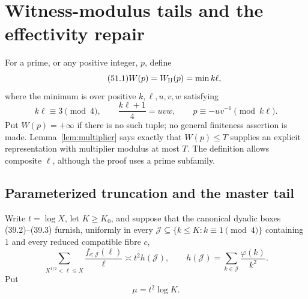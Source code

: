 \documentclass[10pt,reqno]{amsart}
\theoremstyle{definition}
\newcommand{\1}{\mathbf 1}
\begin{document}
\begingroup
\setlength{\abovedisplayskip}{6pt plus 2pt minus 2pt}
\setlength{\belowdisplayskip}{6pt plus 2pt minus 2pt}
\setlength{\abovedisplayshortskip}{2pt plus 1pt}
\setlength{\belowdisplayshortskip}{4pt plus 1pt minus 1pt}
\linespread{0.97}\selectfont
\section{Witness-modulus tails and the effectivity repair}
\label{sec:witness-tail}
For a prime, or any positive integer, $p$, define
\begin{equation}\tag{51.1}
 W(p)=W_{\rm II}(p)=\min k\ell,
\end{equation}
where the minimum is over positive $k,\ell,u,v,w$ satisfying
\begin{equation}\tag{51.2}
 k\ell\equiv3\pmod4,\qquad \frac{k\ell+1}{4}=uvw,
 \qquad p\equiv-uv^{-1}\pmod {k\ell}.
\end{equation}
Put $W(p)=+\infty$ if there is no such tuple; no general finiteness
assertion is made.  Lemma~\ref{lem:multiplier} says exactly that $W(p)\leq T$
supplies an explicit representation with multiplier modulus at most $T$.
The definition allows composite $\ell$, although the proof uses a prime
subfamily.

\subsection{Parameterized truncation and the master tail}
Write $t=\log X$, let $K\geq K_0$, and suppose that the canonical dyadic
boxes (39.2)--(39.3) furnish, uniformly in every
$\mathcal J\subseteq\{k\leq K:k\equiv1\pmod4\}$ containing $1$ and every
reduced compatible fibre $c$,
\begin{equation}\tag{51.3}
 \sum_{X^{1/2}<\ell\leq X}\frac{f_{c;\mathcal J}(\ell)}\ell
 \asymp t^2h(\mathcal J),\qquad
 h(\mathcal J)=\sum_{k\in\mathcal J}\frac{\varphi(k)}{k^2}.
\end{equation}
Put
\begin{equation}\tag{51.4}
                         \mu=t^2\log K.
\end{equation}
\end{document}
